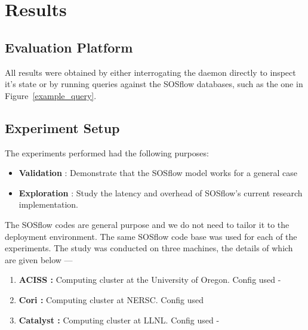 
\section{Results} %
\subsection{Evaluation Platform} %
All results were obtained by either interrogating the daemon directly
to inspect it's state or by running queries against the SOSflow
databases, such as the one in Figure~\ref{example_query}.
%
%
%
%


\subsection{Experiment Setup} %
%
The experiments performed had the following purposes:
\begin{itemize}
\item \textbf{Validation} : Demonstrate that the SOSflow model works for a general case
\item \textbf{Exploration} : Study the latency and overhead of
  SOSflow's current research implementation.
\end {itemize}
%
The SOSflow codes are general purpose and we do not need to 
tailor it to the deployment environment.
%
The same SOSflow code base was used for each of the experiments.
%
The study was conducted on three machines, 
the details of which are given below ---
%
\begin{enumerate}
\item \textbf{ACISS :} Computing cluster at the University of Oregon. Config used -
\item \textbf{Cori :} Computing cluster at NERSC. Config used 
\item \textbf{Catalyst :} Computing cluster at LLNL. Config used - 
\end{enumerate}

